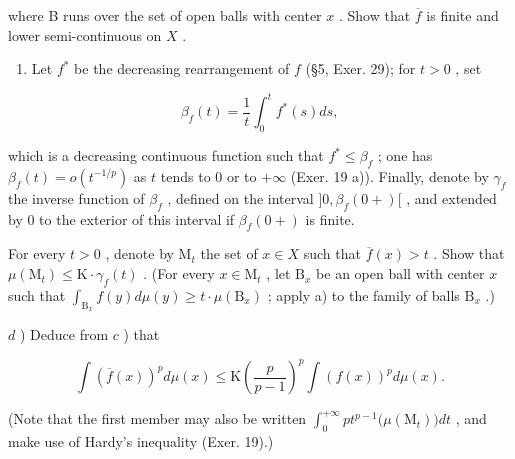 where B runs over the set of open balls with center \(x\) . Show that \(\overline{f}\) is finite and lower semi-continuous on \(X\) .

\begin{enumerate}
\def\labelenumi{\alph{enumi})}
\setcounter{enumi}{2}
\tightlist
\item
  Let \(f^*\) be the decreasing rearrangement of \(f\) (§5, Exer. 29); for \(t > 0\) , set
\end{enumerate}

\[
\beta_ {f} (t) = \frac {1}{t} \int_ {0} ^ {t} f ^ {*} (s) d s,
\]

which is a decreasing continuous function such that \(f^* \leqslant \beta_f\) ; one has \(\beta_f(t) = o(t^{-1/p})\) as \(t\) tends to 0 or to \(+\infty\) (Exer. 19 a)). Finally, denote by \(\gamma_f\) the inverse function of \(\beta_f\) , defined on the interval \(]0, \beta_f(0+)[\) , and extended by 0 to the exterior of this interval if \(\beta_f(0+)\) is finite.

For every \(t > 0\) , denote by \(\mathrm{M}_t\) the set of \(x \in X\) such that \(\overline{f}(x) > t\) . Show that \(\mu(\mathrm{M}_t) \leqslant \mathrm{K} \cdot \gamma_f(t)\) . (For every \(x \in \mathrm{M}_t\) , let \(\mathrm{B}_x\) be an open ball with center \(x\) such that \(\int_{\mathrm{B}_x} f(y) d\mu(y) \geqslant t \cdot \mu(\mathrm{B}_x)\) ; apply a) to the family of balls \(\mathrm{B}_x\) .)

\(d\) ) Deduce from \(c\) ) that

\[
\int \left(\overline {{f}} (x)\right) ^ {p} d \mu (x) \leqslant \mathrm{K} \left(\frac {p}{p - 1}\right) ^ {p} \int \left(f (x)\right) ^ {p} d \mu (x).
\]

(Note that the first member may also be written \(\int_0^{+\infty}pt^{p - 1}\big(\mu (\mathrm{M}_t)\big)dt\) , and make use of Hardy's inequality (Exer. 19).)
\relax{}
\setcounter{exercisegroup}{7}
\edef\CurrentExerciseGroup{\arabic{exercisegroup}}
